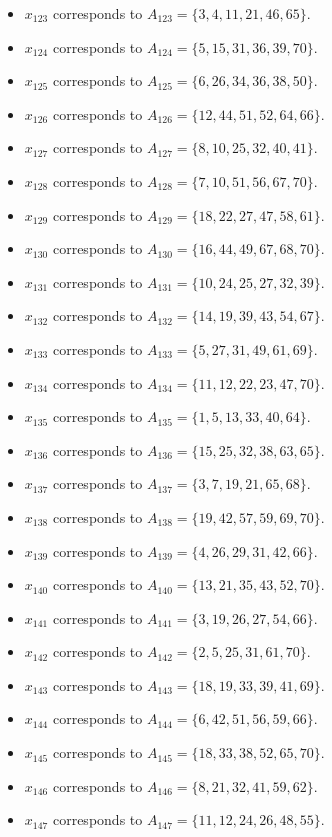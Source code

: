 \documentclass[11pt]{article}
\begin{document}
\begin{itemize}
\item $x_{123}$ corresponds to $A_{123}=\{3, 4, 11, 21, 46, 65\}$.
\item $x_{124}$ corresponds to $A_{124}=\{5, 15, 31, 36, 39, 70\}$.
\item $x_{125}$ corresponds to $A_{125}=\{6, 26, 34, 36, 38, 50\}$.
\item $x_{126}$ corresponds to $A_{126}=\{12, 44, 51, 52, 64, 66\}$.
\item $x_{127}$ corresponds to $A_{127}=\{8, 10, 25, 32, 40, 41\}$.
\item $x_{128}$ corresponds to $A_{128}=\{7, 10, 51, 56, 67, 70\}$.
\item $x_{129}$ corresponds to $A_{129}=\{18, 22, 27, 47, 58, 61\}$.
\item $x_{130}$ corresponds to $A_{130}=\{16, 44, 49, 67, 68, 70\}$.
\item $x_{131}$ corresponds to $A_{131}=\{10, 24, 25, 27, 32, 39\}$.
\item $x_{132}$ corresponds to $A_{132}=\{14, 19, 39, 43, 54, 67\}$.
\item $x_{133}$ corresponds to $A_{133}=\{5, 27, 31, 49, 61, 69\}$.
\item $x_{134}$ corresponds to $A_{134}=\{11, 12, 22, 23, 47, 70\}$.
\item $x_{135}$ corresponds to $A_{135}=\{1, 5, 13, 33, 40, 64\}$.
\item $x_{136}$ corresponds to $A_{136}=\{15, 25, 32, 38, 63, 65\}$.
\item $x_{137}$ corresponds to $A_{137}=\{3, 7, 19, 21, 65, 68\}$.
\item $x_{138}$ corresponds to $A_{138}=\{19, 42, 57, 59, 69, 70\}$.
\item $x_{139}$ corresponds to $A_{139}=\{4, 26, 29, 31, 42, 66\}$.
\item $x_{140}$ corresponds to $A_{140}=\{13, 21, 35, 43, 52, 70\}$.
\item $x_{141}$ corresponds to $A_{141}=\{3, 19, 26, 27, 54, 66\}$.
\item $x_{142}$ corresponds to $A_{142}=\{2, 5, 25, 31, 61, 70\}$.
\item $x_{143}$ corresponds to $A_{143}=\{18, 19, 33, 39, 41, 69\}$.
\item $x_{144}$ corresponds to $A_{144}=\{6, 42, 51, 56, 59, 66\}$.
\item $x_{145}$ corresponds to $A_{145}=\{18, 33, 38, 52, 65, 70\}$.
\item $x_{146}$ corresponds to $A_{146}=\{8, 21, 32, 41, 59, 62\}$.
\item $x_{147}$ corresponds to $A_{147}=\{11, 12, 24, 26, 48, 55\}$.

\end{itemize}
\end{document}
